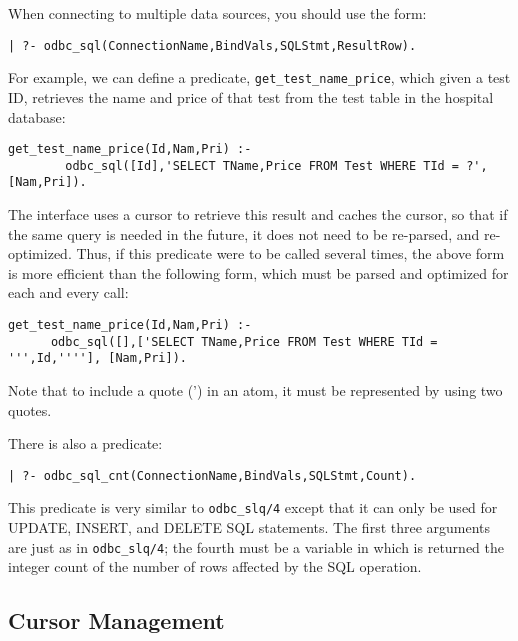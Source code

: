 When connecting to multiple data sources, you should use the form:

\begin{verbatim}
| ?- odbc_sql(ConnectionName,BindVals,SQLStmt,ResultRow).
\end{verbatim}

For example, we can define a predicate, {\tt get\_test\_name\_price},
which given a test ID, retrieves the name and price of that test from
the test table in the hospital database:

\begin{verbatim}
get_test_name_price(Id,Nam,Pri) :-
        odbc_sql([Id],'SELECT TName,Price FROM Test WHERE TId = ?', [Nam,Pri]).
\end{verbatim}

The interface uses a cursor to retrieve this result and caches the
cursor, so that if the same query is needed in the future, it does not
need to be re-parsed, and re-optimized.  Thus, if this predicate were
to be called several times, the above form is more efficient than the
following form, which must be parsed and optimized for each and every
call:

\begin{verbatim}
get_test_name_price(Id,Nam,Pri) :-
      odbc_sql([],['SELECT TName,Price FROM Test WHERE TId = ''',Id,''''], [Nam,Pri]).
\end{verbatim}

Note that to include a quote (') in an atom, it must be represented
by using two quotes.

There is also a predicate:
\begin{verbatim}
| ?- odbc_sql_cnt(ConnectionName,BindVals,SQLStmt,Count).
\end{verbatim}

This predicate is very similar to {\tt odbc\_slq/4} except that it can
only be used for UPDATE, INSERT, and DELETE SQL statements.  The first
three arguments are just as in {\tt odbc\_slq/4}; the fourth must be a
variable in which is returned the integer count of the number of rows
affected by the SQL operation.


\subsection{Cursor Management} \label{odbc:cursors}

